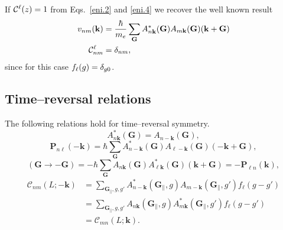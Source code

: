 If ${\mathbf{\cal C}}^\ell(z)=1$ from Eqs.~\eqref{eni.2} and \eqref{eni.4}
we recover the well known
result
\begin{align}\label{eni.21}
  v_{nm}(\mathbf{k})&=
\frac{\hbar}{m_e}
\sum_{\mathbf{G}} A^*_{n\mathbf{k}}(\mathbf{G})  A_{m\mathbf{k}}(\mathbf{G})
(\mathbf{k}+\mathbf{G})
\nonumber\\
{\mathbf{\cal C}}^\ell_{nm}&=\delta_{nm}
,
\end{align}  
since for this case $f_\ell(g)=\delta_{g0}$.

\subsection{Time--reversal relations}
The following relations hold for time--reversal symmetry.
\begin{equation*}
A_{n\mathbf{k}}^{*}(\mathbf{G}) = A_{n-\mathbf{k}}(\mathbf{G}),
\end{equation*}
\begin{equation*}
\mathbf{P}_{n\ell }(-\mathbf{k}) 
=   \hbar\sum_{\mathbf{G}}
    A_{n-\mathbf{k}}^{*}(\mathbf{G})
    A_{\ell -\mathbf{k}}(\mathbf{G})(-\mathbf{k}+\mathbf{G}),
\end{equation*}
\begin{equation*}
(\mathbf{G}\rightarrow-\mathbf{G})
=   -\hbar\sum_{\mathbf{G}}
    A_{n\mathbf{k}}(\mathbf{G})
    A_{\ell\mathbf{k}}^{*}(\mathbf{G})(\mathbf{k}+\mathbf{G})
=   -\mathbf{P}_{\ell n}(\mathbf{k}),
\end{equation*}
\begin{align*}
\mathcal{C}_{nm} (L;-\mathbf{k}) 
&=  \sum_{\mathbf{G}_{\parallel},g,g'}
    A_{n-\mathbf{k}}^{*}(\mathbf{G}_{\parallel},g)
    A_{m-\mathbf{k}}(\mathbf{G}_{\parallel},g')
    f_{\ell}(g-g') \\
&=  \sum_{\mathbf{G}_{\parallel},g,g'}
    A_{n\mathbf{k}} (\mathbf{G}_{\parallel},g)
    A_{m\mathbf{k}}^{*} (\mathbf{G}_{\parallel},g')
    f_{\ell}(g-g') \\
&=  \mathcal{C}_{mn}(L;\mathbf{k}).
\end{align*}
